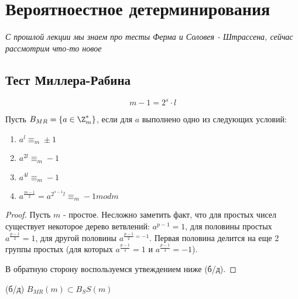 
\section{Вероятноестное детерминирования}

\textit{С прошлой лекции мы знаем про тесты Ферма и Соловея - Штрассена, сейчас рассмотрим что-то новое}

\subsection{Тест Миллера-Рабина}

$$ m - 1 = 2^s \cdot l$$

Пусть $B_{MR} = \{a \in \Z^{*}_{m}\}$, если для $a$ выполнено одно из следующих условий:
\begin{enumerate}
    \item $a^l \equiv_m \pm 1$
    \item $a^{2l} \equiv_m -1$
    \item $a^{4l} \equiv_m -1$
    \item   $a^{\frac{m - 1}{2}} = a^{2^{s-1} l} \equiv_m -1 mod m$
\end{enumerate}

\begin{proof}
    Пусть $m$ - простое. Несложно заметить факт, что для простых чисел существует некоторое дерево ветвлений: $a^{p - 1} = 1$, для половины простых $a^{\frac{p-1}{2}} = 1$, для другой половины $a^{\frac{p-1}{2} = -1}$. Первая половина делится на еще 2 группы простых (для которых $a^{\frac{p-1}{4}} = 1$ и $a^{\frac{p-1}{4}} = -1$). 

    В обратную сторону воспользуемся утвеждением ниже (б/д).
\end{proof}

\begin{proposition}{(б/д)}
    $B_{MR}(m) \subset B_SS(m)$
\end{proposition}

